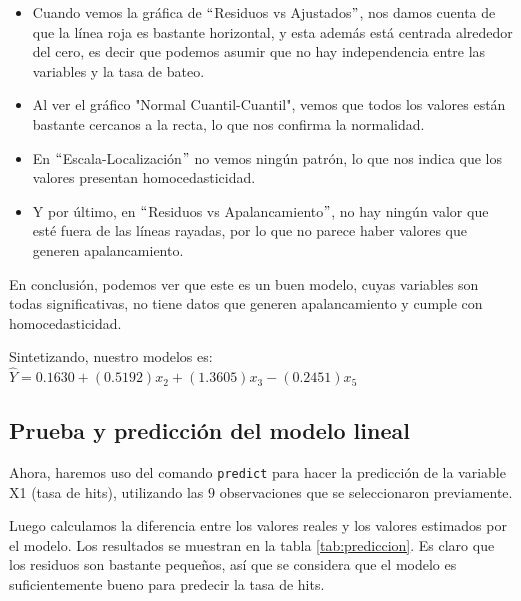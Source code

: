 \documentclass{staprojteamusb}
\begin{document}
 \begin{itemize}
   \item Cuando vemos la gráfica de $``$Residuos vs Ajustados$"$, nos damos cuenta de que la línea roja es bastante horizontal, y esta además está centrada alrededor del cero, es decir que podemos asumir que no hay independencia entre las variables y la tasa de bateo.
   \item Al ver el gráfico "Normal Cuantil-Cuantil", vemos que todos los valores están bastante cercanos a la recta, lo que nos confirma la normalidad.
   \item En $``$Escala-Localización$"$ no vemos ningún patrón, lo que nos indica que los valores presentan homocedasticidad.
   \item Y por último, en $``$Residuos vs Apalancamiento$"$, no hay ningún valor que esté fuera de las líneas rayadas, por lo que no parece haber valores que generen apalancamiento.
 \end{itemize}

 En conclusión, podemos ver que este es un buen modelo, cuyas variables son todas significativas, no tiene datos que generen apalancamiento y cumple con homocedasticidad.

 Sintetizando, nuestro modelos es:
 \(\hat{Y}=0.1630+(0.5192)x_2+(1.3605)x_3-(0.2451)x_5\)

 \hypertarget{prueba-y-predicciuxf3n-del-modelo-lineal}{%
 \subsection{Prueba y predicción del modelo lineal}\label{prueba-y-predicciuxf3n-del-modelo-lineal}}

 Ahora, haremos uso del comando \texttt{predict} para hacer la predicción de la variable X1 (tasa de hits), utilizando las \(9\) observaciones que se seleccionaron previamente.

 Luego calculamos la diferencia entre los valores reales y los valores estimados por el modelo. Los resultados se muestran en la tabla \ref{tab:prediccion}. Es claro que los residuos son bastante pequeños, así que se considera que el modelo es suficientemente bueno para predecir la tasa de hits.
\end{document}
